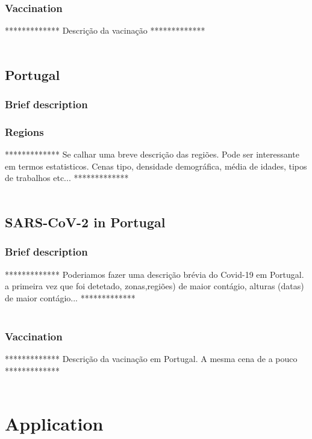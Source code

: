 \documentclass[11pt,a4paper]{report}
\begin{document}
\subsection{Vaccination}
    ************* Descrição da vacinação   *************\\ \\


\section{Portugal}
\subsection{Brief description}

\subsection{Regions}
    ************* Se calhar uma breve descrição das regiões. Pode ser interessante em termos estatisticos. Cenas tipo, densidade demográfica, média de idades, tipos de trabalhos etc...   *************\\ \\

\section{SARS-CoV-2 in Portugal}
\subsection{Brief description}
    ************* Poderiamos fazer uma descrição brévia do Covid-19 em Portugal. a primeira vez que foi detetado, zonas,regiões) de maior contágio, alturas (datas) de maior contágio...   *************\\ \\
\subsection{Vaccination}
    ************* Descrição da vacinação em Portugal. A mesma cena de a pouco  *************\\ \\

\chapter{Application}
\end{document}
